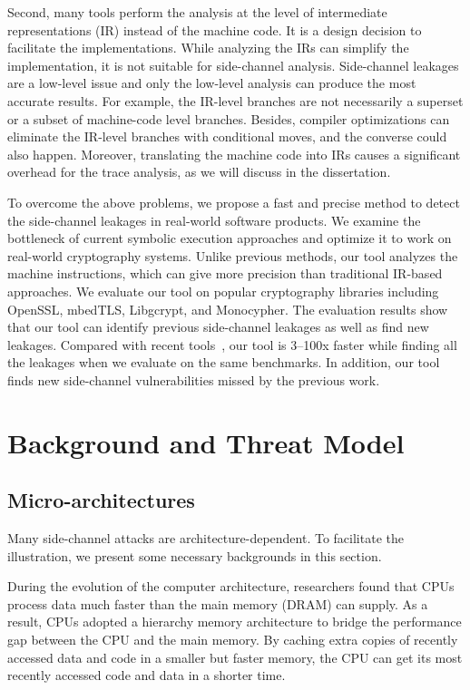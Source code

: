 Second, many tools perform the analysis at the level of intermediate representations (IR) instead of the machine code. It is a design decision to facilitate the implementations. While analyzing the IRs can simplify the implementation, it is not suitable for side-channel analysis.  Side-channel leakages are a low-level issue and only the low-level analysis can produce the most accurate results. For example, the IR-level branches are not necessarily a superset or a subset of machine-code level branches. Besides, compiler optimizations can eliminate the IR-level branches with conditional moves, and the converse could also happen. Moreover, translating the machine code into IRs causes a significant overhead for the trace analysis, as we will discuss in the dissertation.

To overcome the above problems, we propose a fast and precise method to detect the side-channel leakages in real-world software products. We examine the bottleneck of current symbolic execution approaches and optimize it to work on real-world cryptography systems. Unlike previous methods, our tool analyzes the machine instructions, which can give more precision than traditional IR-based approaches. We evaluate our tool on popular cryptography libraries including OpenSSL, mbedTLS, Libgcrypt, and Monocypher. The evaluation results show that our tool can identify previous side-channel leakages as well as find new leakages. Compared with recent tools~\cite{203878,217537,Wichelmann:2018:MFF:3274694.3274741}, our tool is 3--100x faster while finding all the leakages when we evaluate on the same benchmarks. In addition, our tool finds new side-channel vulnerabilities missed by the previous work. 

\section{Background and Threat Model}
\subsection{Micro-architectures}
Many side-channel attacks are architecture-dependent. To facilitate the illustration, we present some necessary backgrounds in this section.

During the evolution of the computer architecture, researchers found that CPUs process data much faster than the main memory (DRAM) can supply. As a result, CPUs adopted a hierarchy memory architecture to bridge the performance gap between the CPU and the main memory. By caching extra copies of recently accessed data and code in a smaller but faster memory, the CPU can get its most recently accessed code and data in a shorter time.

